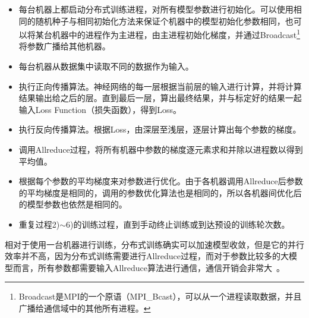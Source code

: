 \begin{itemize}
    \item [1)]
    每台机器上都启动分布式训练进程，对所有模型参数进行初始化。可以使用相同的随机种子与相同初始化方法来保证个机器中的模型初始化参数相同，也可以将某台机器中的进程作为主进程，由主进程初始化梯度，并通过Broadcast\footnote{Broadcast是MPI的一个原语（MPI\_Bcast），可以从一个进程读取数据，并且广播给通信域中的其他所有进程。}将参数广播给其他机器。
    \item [2)]
    每台机器从数据集中读取不同的数据作为输入。
    \item [3)]
    执行正向传播算法。神经网络的每一层根据当前层的输入进行计算，并将计算结果输出给之后的层。直到最后一层，算出最终结果，并与标定好的结果一起输入Loss Function（损失函数），得到Loss。
    \item [4)]
    执行反向传播算法。根据Loss，由深层至浅层，逐层计算出每个参数的梯度。
    \item [5)]
    调用Allreduce过程，将所有机器中参数的梯度逐元素求和并除以进程数以得到平均值。
    \item [6)]
    根据每个参数的平均梯度来对参数进行优化。由于各机器调用Allreduce后参数的平均梯度是相同的，调用的参数优化算法也是相同的，所以各机器间优化后的模型参数也依然是相同的。
    \item [7)]
    重复过程2)$\sim$6)的训练过程，直到手动终止训练或到达预设的训练轮次数。
\end{itemize}

相对于使用一台机器进行训练，分布式训练确实可以加速模型收敛，但是它的并行效率并不高，因为分布式训练需要进行Allreduce过程，而对于参数比较多的大模型而言，所有参数都需要输入Allreduce算法进行通信，通信开销会非常大~\cite{li2014communication, wen2017terngrad}。